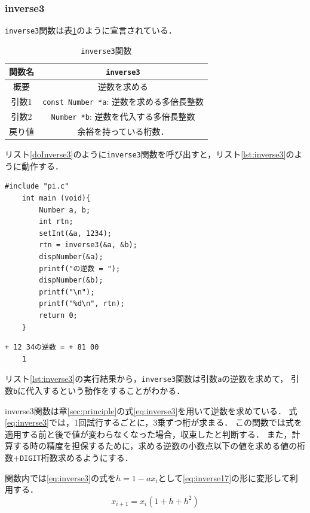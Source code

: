 \documentclass[a4paper,11pt,dvipdfmx]{jsarticle}
\begin{document}
\subsubsection{inverse3}
\texttt{inverse3}関数は表\ref{table:lst:inverse3}のように宣言されている．

\begin{table}[H]
\centering
\caption{\texttt{inverse3}関数}
\label{table:lst:inverse3}
\begin{tabular}{c||c}
\hline
関数名    & \texttt{inverse3}   \\
\hline
概要    & 逆数を求める   \\
\hline
引数1   & \texttt{const Number *a}: 逆数を求める多倍長整数  \\
引数2   & \texttt{Number *b}: 逆数を代入する多倍長整数  \\
\hline
戻り値    & 余裕を持っている桁数．  \\
\hline
\end{tabular}
\end{table}

リスト\ref{doInverse3}のように\texttt{inverse3}関数を呼び出すと，リスト\ref{lst:inverse3}のように動作する．

\begin{lstlisting}[caption=\texttt{inverse3}関数の呼び出し,label=doInverse3]
    #include "pi.c"
    int main (void){
        Number a, b;
        int rtn;
        setInt(&a, 1234);
        rtn = inverse3(&a, &b);
        dispNumber(&a);
        printf("の逆数 = ");
        dispNumber(&b);
        printf("\n");
        printf("%d\n", rtn);
        return 0;
    }
\end{lstlisting}

\begin{lstlisting}[caption=リスト\ref{doInverse3}の実行結果,label=lst:inverse3]
    + 12 34の逆数 = + 81 00
    1
\end{lstlisting}

リスト\ref{lst:inverse3}の実行結果から，\texttt{inverse3}関数は引数\texttt{a}の逆数を求めて，
引数\texttt{b}に代入するという動作をすることがわかる．

inverse3関数は章\ref{sec:principle}の式\eqref{eq:inverse3}を用いて逆数を求めている．
式\eqref{eq:inverse3}では，1回試行するごとに，3乗ずつ桁が求まる．
この関数では式を適用する前と後で値が変わらなくなった場合，収束したと判断する．
また，計算する時の精度を担保するために，求める逆数の小数点以下の値を求める値の桁数$+$\texttt{DIGIT}桁数求めるようにする．

関数内では\eqref{eq:inverse3}の式を$h = 1 - ax_i$として\eqref{eq:inverse17}の形に変形して利用する．
\begin{equation}
    x_{i+1} = x_i(1 + h + h^2)
    \label{eq:inverse17}
\end{equation}
\end{document}
